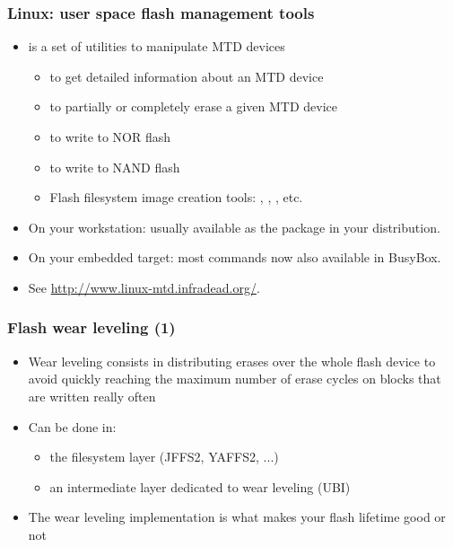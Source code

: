 \begin{frame}
  \frametitle{Linux: user space flash management tools}
  \begin{itemize}
  \item {} is a set of utilities to manipulate MTD devices
    \begin{itemize}
    \item {} to get detailed information about an MTD device
    \item {} to partially or completely erase a given
      MTD device
    \item {} to write to NOR flash
    \item {} to write to NAND flash
    \item Flash filesystem image creation tools: ,
      , , etc.
    \end{itemize}
  \item On your workstation: usually available as the 
      package in your distribution.
  \item On your embedded target: most commands now also available
      in BusyBox.
  \item See \url{http://www.linux-mtd.infradead.org/}.
  \end{itemize}
\end{frame}


\begin{frame}
  \frametitle{Flash wear leveling (1)}
  \begin{itemize}
  \item Wear leveling consists in distributing erases over the whole
    flash device to avoid quickly reaching the maximum number of erase
    cycles on blocks that are written really often
  \item Can be done in:
    \begin{itemize}
    \item the filesystem layer (JFFS2, YAFFS2, ...)
    \item an intermediate layer dedicated to wear leveling (UBI)
    \end{itemize}
  \item The wear leveling implementation is what makes your flash
    lifetime good or not
  \end{itemize}
\end{frame}

